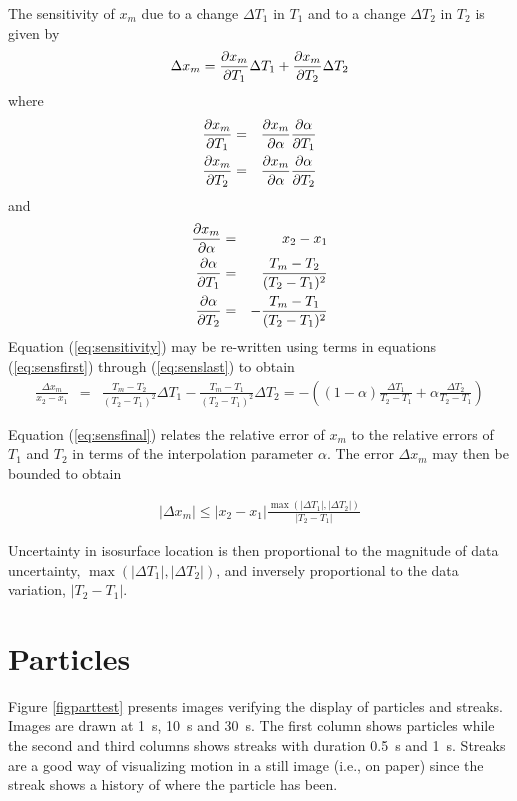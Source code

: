 \documentclass[11pt,twoside]{book}
\begin{document}
\noindent The sensitivity of $x_m$ due to a change $\Delta T_1$ in $T_1$ and to a
change $\Delta T_2$ in $T_2$ is given by
\begin{eqnarray}
\Delta x_m= \frac{\partial x_m}{\partial T_1} \Delta T_1 + \frac{\partial x_m}{\partial T_2} \Delta T_2
\label{eq:sensitivity}
\end{eqnarray}
where
\begin{eqnarray}
\frac{\partial x_m}{\partial T_1}&=&\frac{\partial x_m}{\partial \alpha}\frac{\partial \alpha}{\partial T_1} \label{eq:sensfirst}\\
\frac{\partial x_m}{\partial T_2}&=&\frac{\partial x_m}{\partial \alpha}\frac{\partial \alpha}{\partial T_2}
\end{eqnarray}
and
\begin{eqnarray}
\frac{\partial x_m}{\partial \alpha}&=&x_2-x_1\\
\frac{\partial \alpha}{\partial T_1}&=&\frac{T_m-T_2}{(T_2-T_1)^2}\\
\frac{\partial \alpha}{\partial T_2}&=&-\frac{T_m-T_1}{(T_2-T_1)^2}
\label{eq:senslast}
\end{eqnarray}
Equation (\ref{eq:sensitivity}) may be re-written using terms in equations
(\ref{eq:sensfirst}) through (\ref{eq:senslast}) to obtain
\begin{eqnarray}
\frac{\Delta x_m}{x_2-x_1}&=&\frac{T_m-T_2}{(T_2-T_1)^2}\Delta T_1-
\frac{T_m-T_1}{(T_2-T_1)^2}\Delta T_2
=-\left(
(1-\alpha)\frac{\Delta T_1}{T_2-T_1}+
\alpha\frac{\Delta T_2}{T_2-T_1}\right)
\label{eq:sensfinal}
\end{eqnarray}

\noindent Equation (\ref{eq:sensfinal}) relates the relative error of $x_m$ to
the relative errors of $T_1$ and $T_2$ in terms of the interpolation parameter $\alpha$.
The error $\Delta x_m$ may then be bounded to obtain

\begin{eqnarray}
|\Delta x_m|\le
|x_2-x_1|\frac{\max(|\Delta T_1|,|\Delta T_2|)}{|T_2-T_1|}
\end{eqnarray}

\noindent Uncertainty in isosurface location is then proportional to the magnitude
of data uncertainty, $\max(|\Delta T_1|,|\Delta T_2|)$, and inversely proportional
to the data variation, $|T_2-T_1|$.


\clearpage

\section{Particles}

Figure \ref{figparttest} presents images verifying the display of particles and streaks.
Images are drawn at \SI{1}{s}, \SI{10}{s} and \SI{30}{s}. The first column shows particles
while the second and third columns shows streaks with duration \SI{0.5}{s} and \SI{1}{s}.
Streaks are a good way of visualizing motion in a still image (i.e., on paper) since the
streak shows a history of where the particle has been.
\end{document}
